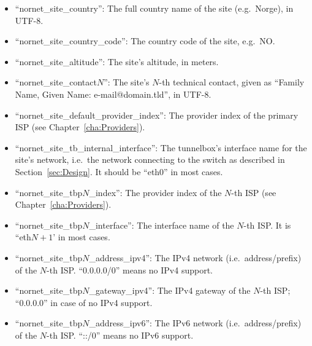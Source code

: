 \begin{itemize}
 \item ``nornet\_site\_country'': The full country name of the site (e.g.\ Norge), in UTF-8.
 
 \item ``nornet\_site\_country\_code'': The country code of the site, e.g.\ NO.
 
 \item ``nornet\_site\_altitude'': The site's altitude, in meters.
 
 \item ``nornet\_site\_contact$N$'': The site's $N$-th technical contact, given as ``Family Name, Given Name: e-mail@domain.tld'', in UTF-8.
 
 \item ``nornet\_site\_default\_provider\_index'': The provider index of the primary ISP (see Chapter~\ref{cha:Providers}).
 
 \item ``nornet\_site\_tb\_internal\_interface'': The tunnelbox's interface name for the site's  network, i.e.\ the network connecting to the switch as described in Section~\ref{sec:Design}. It should be ``eth0'' in most cases.
 
 \item ``nornet\_site\_tbp$N$\_index'': The provider index of the $N$-th ISP (see Chapter~\ref{cha:Providers}).
 
 \item ``nornet\_site\_tbp$N$\_interface'': The interface name of the $N$-th ISP. It is ``eth$N+1$' in most cases.

 \item ``nornet\_site\_tbp$N$\_address\_ipv4'': The IPv4 network (i.e.\ address/prefix) of the $N$-th ISP. ``0.0.0.0/0'' means no IPv4 support.
 
 \item ``nornet\_site\_tbp$N$\_gateway\_ipv4'': The IPv4 gateway of the $N$-th ISP; ``0.0.0.0'' in case of no IPv4 support.
 
 \item ``nornet\_site\_tbp$N$\_address\_ipv6'': The IPv6 network (i.e.\ address/prefix) of the $N$-th ISP. ``::/0'' means no IPv6 support.
 

\end{itemize}
